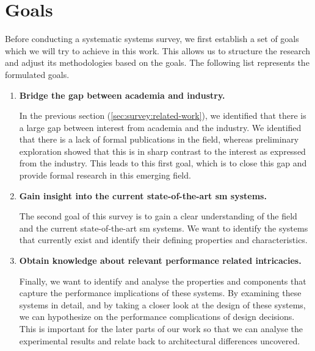 \section{Goals}
\label{sec:survey:goals}


Before conducting a systematic systems survey, we first establish a set of goals which we will try to achieve in this work. This allows us to structure the research and adjust its methodologies based on the goals. The following list represents the formulated goals.

\begin{enumerate}[label=\textbf{G\arabic*}, leftmargin=3\parindent]
    \item \textbf{Bridge the gap between academia and industry.}
    \label{g-1}
    
    In the previous section (\cref{sec:survey:related-work}), we identified that there is a large gap between interest from academia and the industry. We identified that there is a lack of formal publications in the field, whereas preliminary exploration showed that this is in sharp contrast to the interest as expressed from the industry. This leads to this first goal, which is to close this gap and provide formal research in this emerging field.
    
    \item \textbf{Gain insight into the current state-of-the-art \gls{sm} systems.}
    \label{g-2}
    
    The second goal of this survey is to gain a clear understanding of the field and the current state-of-the-art \gls{sm} systems. We want to identify the systems that currently exist and identify their defining properties and characteristics.

    \item \textbf{Obtain knowledge about relevant performance related intricacies.}
    \label{g-3}
    
    Finally, we want to identify and analyse the properties and components that capture the performance implications of these systems. By examining these systems in detail, and by taking a closer look at the design of these systems, we can hypothesize on the performance complications of design decisions. This is important for the later parts of our work so that we can analyse the experimental results and relate back to architectural differences uncovered.
    
\end{enumerate}

